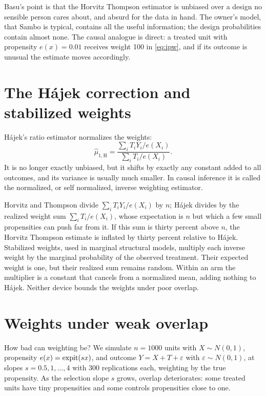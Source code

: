 Basu's point is that the Horvitz Thompson estimator is unbiased over a design no sensible person cares about, and absurd for the data in hand. The owner's model, that Sambo is typical, contains all the useful information; the design probabilities contain almost none. The causal analogue is direct: a treated unit with propensity $e(x) = 0.01$ receives weight 100 in \eqref{eq:ipw}, and if its outcome is unusual the estimate moves accordingly.

\section{The H\'ajek correction and stabilized weights}\label{sec:hajek}

H\'ajek's ratio estimator normalizes the weights:
\[
\hat\mu_{1,\mathrm{H}} = \frac{\sum_i T_i Y_i / e(X_i)}{\sum_i T_i / e(X_i)}.
\]
It is no longer exactly unbiased, but it shifts by exactly any constant added to all outcomes, and its variance is usually much smaller. In causal inference it is called the normalized, or self normalized, inverse weighting estimator.

Horvitz and Thompson divide $\sum_i T_iY_i/e(X_i)$ by $n$; H\'ajek divides by the realized weight sum $\sum_i T_i/e(X_i)$, whose expectation is $n$ but which a few small propensities can push far from it. If this sum is thirty percent above $n$, the Horvitz Thompson estimate is inflated by thirty percent relative to H\'ajek. Stabilized weights, used in marginal structural models, multiply each inverse weight by the marginal probability of the observed treatment. Their expected weight is one, but their realized sum remains random. Within an arm the multiplier is a constant that cancels from a normalized mean, adding nothing to H\'ajek. Neither device bounds the weights under poor overlap.



\section{Weights under weak overlap}

How bad can weighting be? We simulate $n = 1000$ units with $X \sim N(0,1)$, propensity $e(x) = \operatorname{expit}(sx)$, and outcome $Y = X + T + \varepsilon$ with $\varepsilon \sim N(0,1)$, at slopes $s = 0.5, 1, \ldots, 4$ with 300 replications each, weighting by the true propensity. As the selection slope $s$ grows, overlap deteriorates: some treated units have tiny propensities and some controls propensities close to one.

